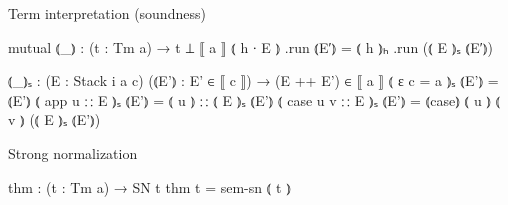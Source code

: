 Term interpretation (soundness)

\begin{code}
mutual
  ⦅_⦆ : (t : Tm a) → t ⊥ ⟦ a ⟧
  ⦅ h ∙ E ⦆ .run ⦅E′⦆ = ⦅ h ⦆ₕ .run (⦅ E ⦆ₛ ⦅E′⦆)

  ⦅_⦆ₛ : (E : Stack i a c) (⦅E'⦆ : E' ∈ ⟦ c ⟧) → (E ++ E') ∈ ⟦ a ⟧
  ⦅ ε {c = a}    ⦆ₛ  ⦅E'⦆ = ⦅E'⦆
  ⦅ app u ∷ E    ⦆ₛ  ⦅E'⦆ = ⦅ u ⦆ ∷ ⦅ E ⦆ₛ ⦅E'⦆
  ⦅ case u v ∷ E ⦆ₛ  ⦅E'⦆ = ⦅case⦆ ⦅ u ⦆ ⦅ v ⦆ (⦅ E ⦆ₛ ⦅E'⦆)
\end{code}

Strong normalization

\begin{code}
thm : (t : Tm a) → SN t
thm t = sem-sn ⦅ t ⦆
\end{code}

